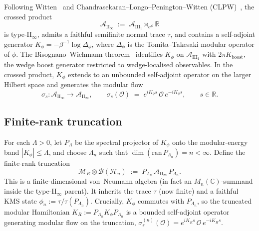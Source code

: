 \documentclass[12pt,a4paper]{article}
\begin{document}
Following Witten~\cite{Witten2022} and Chandrasekaran--Longo--Penington--Witten
(CLPW)~\cite{CLPW2023}, the crossed product
\begin{equation}
  \mathcal{A}_{\mathrm{II}_\infty}
  \;:=\; \mathcal{A}_{\mathrm{III}_1} \rtimes_{\sigma^\phi} \mathbb{R}
  \label{eq:crossed}
\end{equation}
is type-II$_\infty$, admits a faithful semifinite normal trace $\tau$,
and contains a self-adjoint generator $K_\phi = -\beta^{-1}\log\Delta_\phi$,
where $\Delta_\phi$ is the Tomita--Takesaki modular operator of $\phi$.
The Bisognano--Wichmann theorem~\cite{BisognanoWichmann1976} identifies
$K_\phi$ on $\mathcal{A}_{\mathrm{III}_1}$ with $2\pi K_{\mathrm{boost}}$,
the wedge boost generator restricted to wedge-localised observables.
In the crossed product, $K_\phi$ extends to an unbounded self-adjoint
operator on the larger Hilbert space and generates the modular flow
\begin{equation}
  \sigma_s : \mathcal{A}_{\mathrm{II}_\infty} \to \mathcal{A}_{\mathrm{II}_\infty},
  \qquad
  \sigma_s(\mathcal{O}) \;=\; e^{i K_\phi s}\,\mathcal{O}\,e^{-i K_\phi s},
  \qquad s \in \mathbb{R}.
  \label{eq:modflow}
\end{equation}

\subsection{Finite-rank truncation}
\label{ssec:trunc}

For each $\Lambda > 0$, let $P_\Lambda$ be the spectral projector of
$K_\phi$ onto the modular-energy band $|K_\phi| \le \Lambda$, and choose
$\Lambda_n$ such that $\dim(\mathrm{ran}\,P_{\Lambda_n}) = n < \infty$.
Define the finite-rank truncation
\begin{equation}
  \mathcal{M}_R \otimes \mathcal{B}(\mathcal{H}_n)
  \;:=\;
  P_{\Lambda_n}\, \mathcal{A}_{\mathrm{II}_\infty}\, P_{\Lambda_n}.
  \label{eq:trunc}
\end{equation}
This is a finite-dimensional von~Neumann algebra (in fact an
$M_n(\mathbb{C})$-summand inside the type-II$_\infty$ parent). It
inherits the trace $\tau$ (now finite) and a faithful KMS state
$\phi_n := \tau / \tau(P_{\Lambda_n})$. Crucially, $K_\phi$ commutes
with $P_{\Lambda_n}$, so the truncated modular Hamiltonian
$K_R := P_{\Lambda_n} K_\phi P_{\Lambda_n}$ is a bounded self-adjoint
operator generating modular flow on the truncation,
$\sigma_s^{(n)}(\mathcal{O}) = e^{i K_R s}\,\mathcal{O}\,e^{-i K_R s}$.
\end{document}
